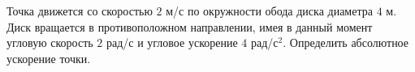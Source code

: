 Точка движется со скоростью $2$ м/с по окружности обода диска диаметра
$4$ м. Диск вращается в противоположном направлении, имея в данный
момент угловую скорость $2$ рад/с и угловое ускорение $4$ рад/с$^2$.
Определить абсолютное ускорение точки.
